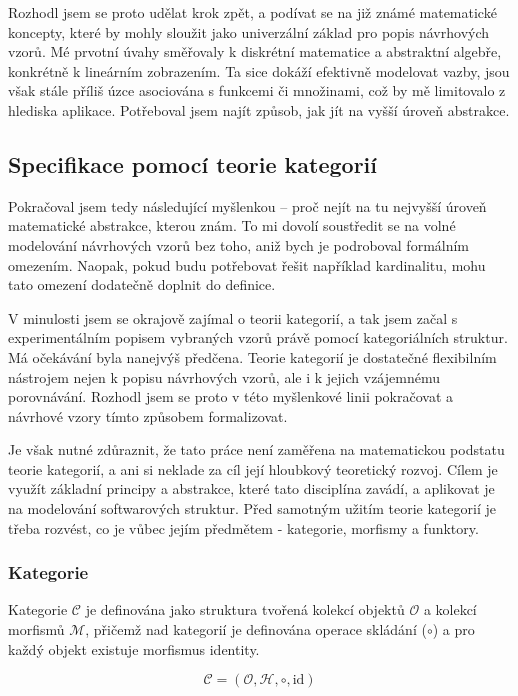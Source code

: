 \documentclass[FM,DP,fonts]{tulthesis}
\begin{document}
Rozhodl jsem se proto udělat krok zpět, a podívat se na již známé matematické koncepty, které by mohly sloužit jako univerzální základ pro popis návrhových vzorů. Mé prvotní úvahy směřovaly k diskrétní matematice a abstraktní algebře, konkrétně k lineárním zobrazením. Ta sice dokáží efektivně modelovat vazby, jsou však stále příliš úzce asociována s funkcemi či množinami, což by mě limitovalo z hlediska aplikace. Potřeboval jsem najít způsob, jak jít na vyšší úroveň abstrakce.

\subsection{Specifikace pomocí teorie kategorií}
Pokračoval jsem tedy následující myšlenkou – proč nejít na tu nejvyšší úroveň matematické abstrakce, kterou znám. To mi dovolí soustředit se na volné modelování návrhových vzorů bez toho, aniž bych je podroboval formálním omezením. Naopak, pokud budu potřebovat řešit například kardinalitu, mohu tato omezení dodatečně doplnit do definice.

V minulosti jsem se okrajově zajímal o teorii kategorií, a tak jsem začal s experimentálním popisem vybraných vzorů právě pomocí kategoriálních struktur. Má očekávání byla nanejvýš předčena. Teorie kategorií je dostatečné flexibilním nástrojem nejen k popisu návrhových vzorů, ale i k jejich vzájemnému porovnávání. Rozhodl jsem se proto v této myšlenkové linii pokračovat a návrhové vzory tímto způsobem formalizovat.

Je však nutné zdůraznit, že tato práce není zaměřena na matematickou podstatu teorie kategorií, a ani si neklade za cíl její hloubkový teoretický rozvoj. Cílem je využít základní principy a abstrakce, které tato disciplína zavádí, a aplikovat je na modelování softwarových struktur. Před samotným užitím teorie kategorií je třeba rozvést, co je vůbec jejím předmětem - kategorie, morfismy a funktory.

\subsubsection{Kategorie}
Kategorie $\mathcal{C}$ je definována jako struktura tvořená kolekcí objektů $\mathcal{O}$ a kolekcí morfismů $\mathcal{M}$, přičemž nad kategorií je definována operace skládání ($\circ$) a pro každý objekt existuje morfismus identity. \parencite{racket-category}

\begin{equation}\label{eq:category-definition}
	\mathcal{C} = (\mathcal{O}, \mathcal{H}, \circ, \text{id})
\end{equation}
\end{document}
